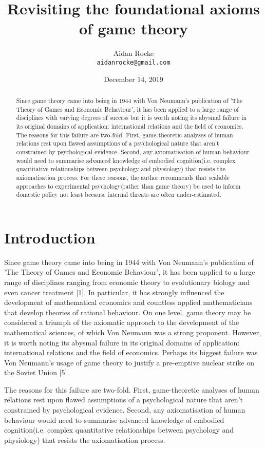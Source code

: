 \documentclass{article}
\title{Revisiting the foundational axioms of game theory}
\date{December 14, 2019}
\author{%
  Aidan Rocke\\
  \texttt{aidanrocke@gmail.com} \\
}
\begin{document}
\maketitle

\begin{abstract}
   Since game theory came into being in 1944 with Von Neumann's publication of 'The Theory of Games and Economic Behaviour', it has been applied to a large range of disciplines with varying degrees of success but it is worth noting its abysmal failure in its original domains of application: international relations and the field of economics. The reasons for this failure are two-fold. First, game-theoretic analyses of human relations rest upon flawed assumptions of a psychological nature that aren't constrained by psychological evidence. Second, any axiomatisation of human behaviour would need to summarise advanced knowledge of embodied cognition(i.e. complex quantitative relationships between psychology and physiology) that resists the axiomatisation process. For these reasons, the author recommends that scalable approaches to experimental psychology(rather than game theory) be used to inform domestic policy not least because internal threats are often under-estimated. 
\end{abstract}

\section{Introduction}

Since game theory came into being in 1944 with Von Neumann's publication of 'The Theory of Games and Economic Behaviour', it has been applied to a large range of disciplines ranging from economic theory to evolutionary biology and even cancer treatment [1]. In particular, it has strongly influenced the development of mathematical economics and countless applied mathematicians that develop theories of rational behaviour. On one level, game theory may be considered a triumph of the axiomatic approach to the development of the mathematical sciences, of which Von Neumann was a strong proponent. However, it is worth noting its abysmal failure in its original domains of application: international relations and the field of economics. Perhaps its biggest failure was Von Neumann's usage of game theory to justify a pre-emptive nuclear strike on the Soviet Union [5]. 

	The reasons for this failure are two-fold. First, game-theoretic analyses of human relations rest upon flawed assumptions of a psychological nature that aren't constrained by psychological evidence. Second, any axiomatisation of human behaviour would need to summarise advanced knowledge of embodied cognition(i.e. complex quantitative relationships between psychology and physiology) that resists the axiomatisation process. 
	
\end{document}
